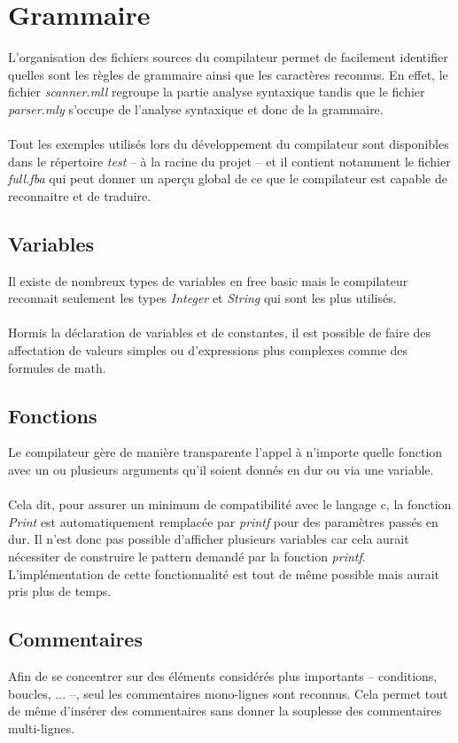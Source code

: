 \documentclass{article}
\begin{document}
\section{Grammaire}
L'organisation des fichiers sources du compilateur permet de facilement identifier quelles sont 
les règles de grammaire ainsi que les caractères reconnus.
En effet, le fichier \emph{scanner.mll} regroupe la partie analyse syntaxique tandis que le fichier 
\emph{parser.mly} s'occupe de l'analyse syntaxique et donc de la grammaire.
\\\\
Tout les exemples utilisés lors du développement du compilateur sont disponibles dans le répertoire 
\emph{test} -- à la racine du projet -- et il contient notamment le fichier \emph{full.fba} qui peut 
donner un aperçu global de ce que le compilateur est capable de reconnaitre et de traduire.

\subsection{Variables}
Il existe de nombreux types de variables en free basic mais le compilateur reconnait seulement les types \emph{Integer}
et \emph{String} qui sont les plus utilisés. 
\\\\
Hormis la déclaration de variables et de constantes, il est possible de faire des affectation de valeurs simples
ou d'expressions plus complexes comme des formules de math.

\subsection{Fonctions}
Le compilateur gère de manière transparente l'appel à n'importe quelle fonction avec un ou plusieurs arguments
qu'il soient donnés en dur ou via une variable.
\\\\
Cela dit, pour assurer un minimum de compatibilité avec le langage c, la fonction \emph{Print} est automatiquement
remplacée par \emph{printf} pour des paramètres passés en dur. Il n'est donc pas possible d'afficher plusieurs 
variables car cela aurait nécessiter de construire le pattern demandé par la fonction \emph{printf}. 
L'implémentation de cette fonctionnalité est tout de même possible mais aurait pris plus de temps.

\subsection{Commentaires}
Afin de se concentrer sur des éléments considérés plus importants -- conditions, boucles, ... --, seul les
commentaires mono-lignes sont reconnus. Cela permet tout de même d'insérer des commentaires sans donner 
la souplesse des commentaires multi-lignes.
\end{document}
